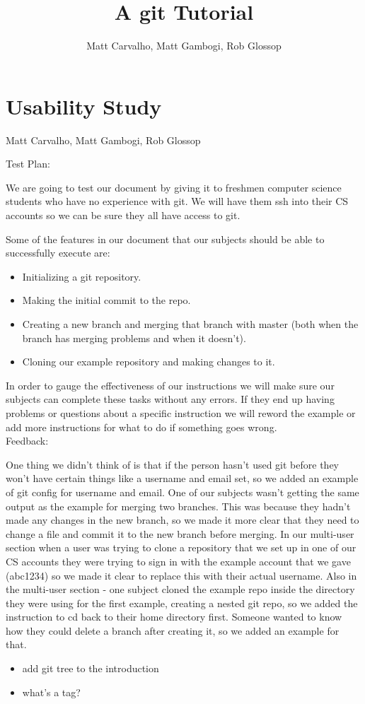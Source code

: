 \documentclass[11pt]{report}
\title{A git Tutorial}
\author{Matt Carvalho, Matt Gambogi, Rob Glossop}
\begin{document}
\section*{Usability Study}
Matt Carvalho, Matt Gambogi, Rob Glossop


Test Plan:

We are going to test our document by giving it to freshmen computer
science students who have no experience with git. We will have them
ssh into their CS accounts so we can be sure they all have access to
git.
        
Some of the features in our document that our subjects should be able
to successfully execute are:

\begin{itemize}
\item Initializing a git repository.

\item Making the initial commit to the repo.

\item Creating a new branch and merging that branch with master (both when
  the branch has merging problems and when it doesn’t).
  
\item Cloning our example repository and making changes to it.
\end{itemize}
In order to gauge the effectiveness of our instructions we will make
sure our subjects can complete these tasks without any errors. If they
end up having problems or questions about a specific instruction
we will reword the example or add more instructions for what to do if something goes wrong.\\


Feedback:


One thing we didn't think of is that if the person hasn't used git before they won't
have certain things like a username and email set, so we added an example of git config for
username and email. One of our subjects wasn't getting the same output as the example 
for merging two branches. This was because they hadn't made any changes in the new branch,
so we made it more clear that they need to change a file and commit it to the new branch 
before merging. In our multi-user section when a user was trying to clone a repository that we 
set up in one of our CS accounts they were trying to sign in with the example account that we gave
(abc1234) so we made it clear to replace this with their actual username. Also in the multi-user section - 
one subject cloned the example repo inside the directory they were using for the first example, creating
a nested git repo, so we added the instruction to cd back to their home directory first. Someone
wanted to know how they could delete a branch after creating it, so we added an example for that.

\begin{itemize}
\item add git tree to the introduction

\item what’s a tag?
\end{itemize}
\end{document}
